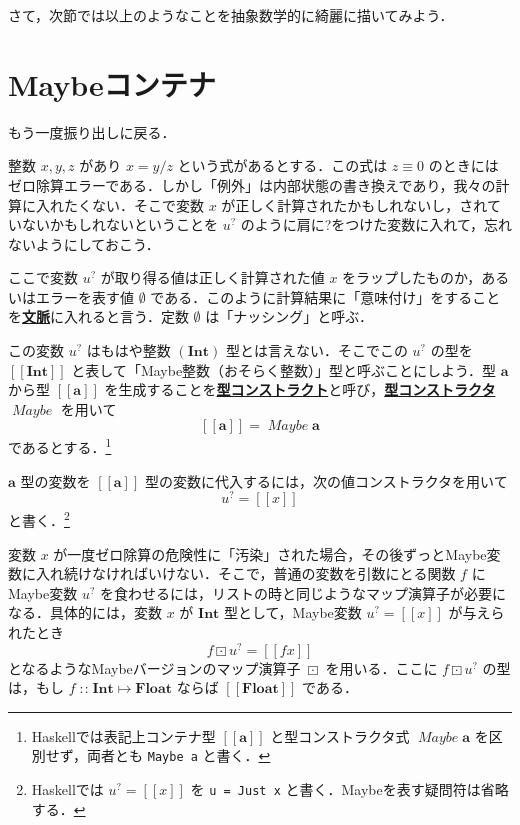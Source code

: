 \documentclass[a4paper,twocolumn]{jsbook}
\def\[{\left[\!\left[}
\def\]{\right]\!\right]}
\newcommand{\programminglanguage}[1]{\textsf{#1}}
\newcommand{\haskell}{\programminglanguage{Haskell}}
\newcommand{\keyword}[1]{{\underline{\textbf{#1}}}}
\newcommand{\code}[1]{\texttt{#1}}
\newcommand{\mNothing}{\emptyset}
\DeclareMathOperator{\mIn}{{:\!:}}
\DeclareMathOperator{\mMapMaybe}{\boxdot}
\DeclareMathOperator{\mMapsTo}{\mapsto}
\newcommand{\mType}[1]{\mathbf{#1}}
\newcommand{\mMaybeWith}[1]{\[#1\]}
\newcommand{\mFloatType}{\mType{Float}}
\newcommand{\mIntType}{\mType{Int}}
\newcommand{\mMaybeType}[1]{\mMaybeWith{\mType{#1}}}
\newcommand{\mTypeConstructor}[1]{\mathit{#1}} %
\DeclareMathOperator{\mMaybeTypeConstructor}{\mTypeConstructor{Maybe}}
\newcommand{\mMaybe}[1]{{#1}^\text{?}}
\newcommand{\mProj}[2]{#1\mMapsTo#2}
\begin{document}
さて，次節では以上のようなことを抽象数学的に綺麗に描いてみよう．

\section{Maybeコンテナ}

もう一度振り出しに戻る．

整数 $x,y,z$ があり $x=y/z$ という式があるとする．この式は $z\equiv0$ のときにはゼロ除算エラーである．しかし「例外」は内部状態の書き換えであり，我々の計算に入れたくない．そこで変数 $x$ が正しく計算されたかもしれないし，されていないかもしれないということを $\mMaybe{u}$ のように肩に?をつけた変数に入れて，忘れないようにしておこう．

ここで変数 $\mMaybe{u}$ が取り得る値は正しく計算された値 $x$ をラップしたものか，あるいはエラーを表す値 $\mNothing$ である．このように計算結果に「意味付け」をすることを\keyword{文脈}に入れると言う．定数 $\mNothing$ は「ナッシング」と呼ぶ．

この変数 $\mMaybe{u}$ はもはや整数 $(\mIntType)$ 型とは言えない．そこでこの $\mMaybe{u}$ の型を $\mMaybeType{\mIntType}$ と表して「Maybe整数（おそらく整数）」型と呼ぶことにしよう．型 $\mType{a}$ から型 $\mMaybeType{a}$ を生成することを\keyword{型コンストラクト}と呼び，\keyword{型コンストラクタ} $\mMaybeTypeConstructor$ を用いて
\begin{equation}
\mMaybeType{a}=\mMaybeTypeConstructor\mType{a}
\end{equation}
であるとする．\footnote{\haskell では表記上コンテナ型 $\mMaybeType{a}$ と型コンストラクタ式 $\mMaybeTypeConstructor\mType{a}$ を区別せず，両者とも \code{Maybe a} と書く．}

$\mType{a}$ 型の変数を $\mMaybeType{a}$ 型の変数に代入するには，次の値コンストラクタを用いて
\begin{equation}
\mMaybe{u}=\mMaybeWith{x}
\end{equation}
と書く．\footnote{\haskell では $\mMaybe{u}=\mMaybeWith{x}$ を \code{u = Just x} と書く．Maybeを表す疑問符は省略する．}

変数 $x$ が一度ゼロ除算の危険性に「汚染」された場合，その後ずっとMaybe変数に入れ続けなければいけない．そこで，普通の変数を引数にとる関数 $f$ にMaybe変数 $\mMaybe{u}$ を食わせるには，リストの時と同じようなマップ演算子が必要になる．具体的には，変数 $x$ が $\mType{Int}$ 型として，Maybe変数 $\mMaybe{u}=\mMaybeWith{x}$ が与えられたとき
\begin{equation}
f\mMapMaybe\mMaybe{u}=\mMaybeWith{fx}
\end{equation}
となるようなMaybeバージョンのマップ演算子 $\mMapMaybe$ を用いる．ここに $f\mMapMaybe\mMaybe{u}$ の型は，もし $f\mIn\mProj{\mIntType}{\mFloatType}$ ならば $\mMaybeType{\mFloatType}$ である．
\end{document}
